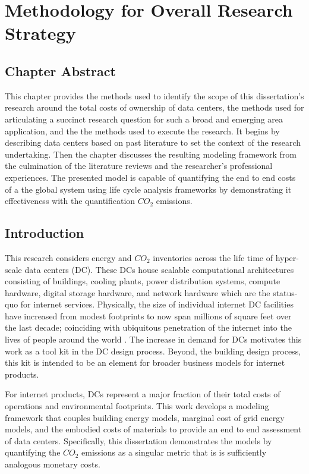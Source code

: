 \chapter{Methodology for Overall Research Strategy}

\section{Chapter Abstract}

This chapter provides the methods used to identify the scope of this dissertation's research around the total costs of ownership of data centers, the methods used for articulating a succinct research question for such a broad and emerging area application, and the the methods used to execute the research. It begins by describing data centers based on past literature to set the context of the research undertaking. Then the chapter discusses the resulting modeling framework from the culmination of the literature reviews and the researcher's professional experiences. The presented model is capable of quantifying the end to end costs of a the global system using life cycle analysis frameworks by demonstrating it effectiveness with the quantification $CO_2$ emissions. 

\section{Introduction}

    This research considers energy and $CO_2$ inventories across the life time of hyper-scale data centers (DC). These DCs house scalable computational architectures consisting of buildings, cooling plants, power distribution systems, compute hardware, digital storage hardware, and network hardware which are the status-quo for internet services. Physically, the size of individual internet DC facilities have increased from modest footprints to now span millions of square feet over the last decade; coinciding with ubiquitous penetration of the internet into the lives of people around the world . The increase in demand for DCs motivates this work as a tool kit in the DC design process. Beyond, the building design process, this kit is intended to be an element for broader business models for internet products.
    
    For internet products, DCs represent a major fraction of their total costs of operations and environmental footprints.  This work develops a modeling framework that couples building energy models, marginal cost of grid energy models, and the embodied costs of materials to provide an end to end assessment of data centers. Specifically, this dissertation demonstrates the models by quantifying the $CO_2$ emissions as a singular metric that is is sufficiently analogous monetary costs.
    
